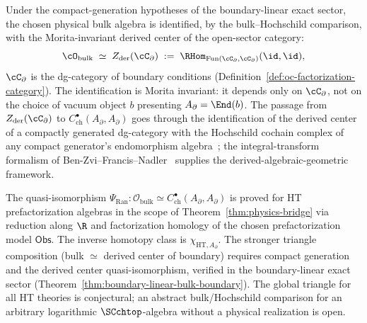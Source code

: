 \begin{remark}
\label{rem:bulk-categorical}
Under the compact-generation hypotheses of the
boundary-linear exact sector, the chosen physical bulk algebra is
identified, by the bulk--Hochschild comparison, with the
Morita-invariant derived center of the open-sector category:
\[
\cO_{\mathrm{bulk}} \;\simeq\; Z_{\mathrm{der}}(\cC_\partial) \;:=\; \RHom_{\mathrm{Fun}(\cC_\partial, \cC_\partial)}(\id, \id),
\]
$\cC_\partial$ is the dg-category of boundary conditions (Definition~\ref{def:oc-factorization-category}). The identification is Morita invariant: it depends only on $\cC_\partial$, not on the choice of vacuum object $b$ presenting $A_\partial = \End(b)$. The passage from $Z_{\mathrm{der}}(\cC_\partial)$ to $C^\bullet_{\mathrm{ch}}(A_\partial, A_\partial)$ goes through the identification of the derived center of a compactly generated dg-category with the Hochschild cochain complex of any compact generator's endomorphism algebra~\cite{Kel06}; the integral-transform formalism of Ben-Zvi--Francis--Nadler~\cite{BZFN10} supplies the derived-algebraic-geometric framework.
\end{remark}

\begin{remark}
\label{rem:bulk-hochschild-scope}
The quasi-isomorphism
\(\Psi_{\mathrm{Ran}}\colon
\mathcal{O}_{\mathrm{bulk}}\simeq
C^\bullet_{\mathrm{ch}}(A_{\partial}, A_{\partial})\) is proved for
HT prefactorization algebras in the scope of
Theorem~\ref{thm:physics-bridge} via reduction along $\R$ and
factorization homology of the chosen prefactorization model
$\mathsf{Obs}$. The inverse homotopy class is
\(\chi_{\mathrm{HT},A_\partial}\). The stronger triangle composition
(bulk $\simeq$ derived center of boundary) requires compact generation
and the derived center quasi-isomorphism, verified in the
boundary-linear exact sector
(Theorem~\ref{thm:boundary-linear-bulk-boundary}). The global triangle
for all HT theories is conjectural; an abstract bulk/Hochschild
comparison for an arbitrary logarithmic $\SCchtop$-algebra without a
physical realization is open.
\end{remark}

